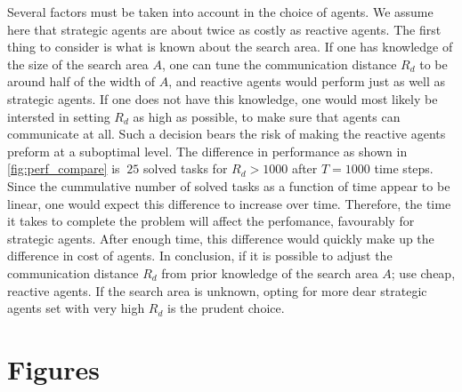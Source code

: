 \documentclass[11pt]{article}
\begin{document}
        Several factors must be taken into account in the choice of agents. We assume here that strategic agents 
        are about twice as costly as reactive agents. The first thing to consider is what is known about the 
        search area. If one has knowledge of the size of the search area $A$, one can tune the communication 
        distance $R_d$ to be around half of the width of $A$, and reactive agents would perform just as well as 
        strategic agents. If one does not have this knowledge, one would 
        most likely be intersted in setting $R_d$ as high as possible, to make sure that agents can communicate at 
        all. Such a decision bears the risk of making the reactive agents preform at a suboptimal level.
        The difference in performance
        as shown in \autoref{fig:perf_compare} is $~25$ solved tasks for $R_d>1000$ after $T=1000$ time 
        steps. Since the cummulative number of solved tasks as a function of time appear to be linear,
        one would expect this difference to increase over time. Therefore, the time it takes to complete 
        the problem will affect the perfomance, favourably for strategic agents. After enough time, this 
        difference would quickly make up the difference in cost of agents. In conclusion, if it is possible
        to adjust the communication distance $R_d$ from prior knowledge of the search area $A$; use cheap,
        reactive agents. If the search area is unknown, opting for more dear strategic agents set with 
        very high $R_d$ is the prudent choice.

\printbibliography

\pagebreak
\appendix

\section{Figures}
\label{app:figs}
\end{document}
